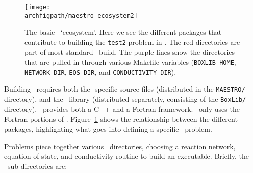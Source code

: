 \begin{figure}[]
\centering
\texttt{[image: \\archfigpath/maestro\_ecosystem2]}
\caption[\maestro\ `ecosystem'] {\label{fig:arch:eco} The basic
  \maestro\ `ecosystem'.  Here we see the different packages that
  contribute to building the {\tt test2} problem in \maestro.  The
  red directories are part of most standard \maestro\ build.  The
  purple lines show the directories that are pulled in through
  various Makefile variables ({\tt BOXLIB\_HOME}, {\tt NETWORK\_DIR},
  {\tt EOS\_DIR}, and {\tt CONDUCTIVITY\_DIR}).}
\end{figure}


Building \maestro\ requires both the \maestro-specific source
files (distributed in the {\tt MAESTRO/} directory), and the
\boxlib\ library (distributed separately, consisting of the {\tt BoxLib/} directory).
\boxlib\ provides both a C++ and a Fortran framework.  \maestro\
only uses the Fortran portions of \boxlib.  Figure~\ref{fig:arch:eco}
shows the relationship between the different packages, highlighting
what goes into defining a specific \maestro\ problem.

Problems piece together various \maestro\ directories, choosing a
reaction network, equation of state, and conductivity routine to build
an executable.  Briefly, the \maestro\ sub-directories are:

